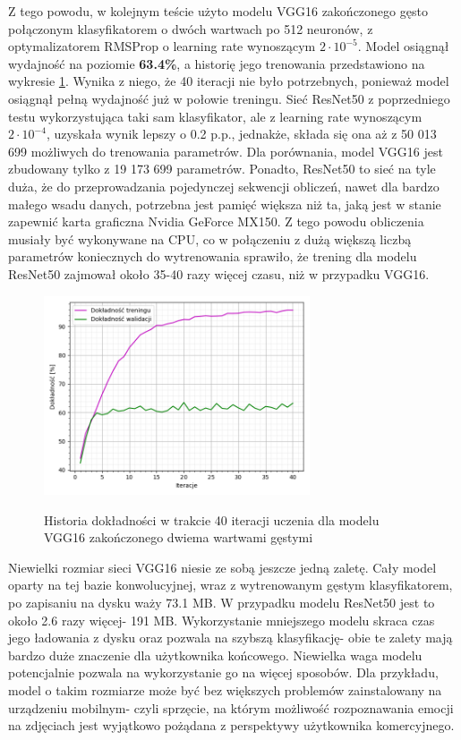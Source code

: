 Z tego powodu, w kolejnym teście użyto modelu VGG16 zakończonego gęsto połączonym klasyfikatorem o dwóch wartwach po 512 neuronów, z optymalizatorem RMSProp o learning rate wynoszącym $2\cdot10^{-5}$. Model osiągnął wydajność na poziomie \textbf{63.4\%}, a historię jego trenowania przedstawiono na wykresie \ref{pic:5.7}. Wynika z niego, że 40 iteracji nie było potrzebnych, ponieważ model osiągnął pełną wydajność już w połowie treningu. Sieć ResNet50 z poprzedniego testu wykorzystująca taki sam klasyfikator, ale z learning rate wynoszącym $2\cdot10^{-4}$, uzyskała wynik lepszy o 0.2 p.p., jednakże, składa się ona aż z 50 013 699 możliwych do trenowania parametrów. Dla porównania, model VGG16 jest zbudowany tylko z 19 173 699 parametrów. Ponadto, ResNet50 to sieć na tyle duża, że do przeprowadzania pojedynczej sekwencji obliczeń, nawet dla bardzo małego wsadu danych, potrzebna jest pamięć większa niż ta, jaką jest w stanie zapewnić karta graficzna Nvidia GeForce MX150. Z tego powodu obliczenia musiały być wykonywane na CPU, co w połączeniu z dużą większą liczbą parametrów koniecznych do wytrenowania sprawiło, że trening dla modelu ResNet50 zajmował około 35-40 razy więcej czasu, niż w przypadku VGG16.

\begin{figure}[H]
    \caption{Historia dokładności w trakcie 40 iteracji uczenia dla modelu VGG16 zakończonego dwiema wartwami gęstymi}
    \centering
    \includegraphics[width=0.7\textwidth]{wykres7.png}
    \label{pic:5.7}
\end{figure}

Niewielki rozmiar sieci VGG16 niesie ze sobą jeszcze jedną zaletę. Cały model oparty na tej bazie konwolucyjnej, wraz z wytrenowanym gęstym klasyfikatorem, po zapisaniu na dysku waży 73.1 MB. W przypadku modelu ResNet50 jest to około 2.6 razy więcej- 191 MB. Wykorzystanie mniejszego modelu skraca czas jego ładowania z dysku oraz pozwala na szybszą klasyfikację- obie te zalety mają bardzo duże znaczenie dla użytkownika końcowego. Niewielka waga modelu potencjalnie pozwala na wykorzystanie go na więcej sposobów. Dla przykładu, model o takim rozmiarze może być bez większych problemów zainstalowany na urządzeniu mobilnym- czyli sprzęcie, na którym możliwość rozpoznawania emocji na zdjęciach jest wyjątkowo pożądana z perspektywy użytkownika komercyjnego.

